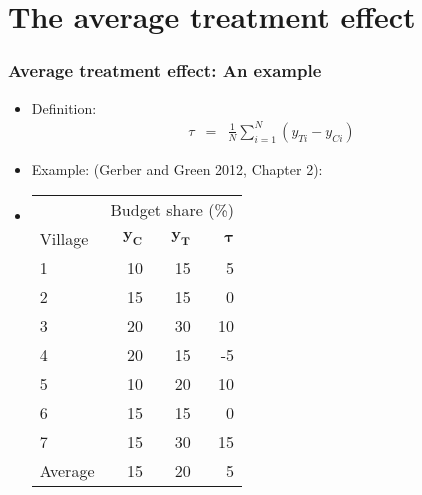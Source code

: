 \documentclass[table, xcolor = {dvipsnames}, 9pt]{beamer}
\theoremstyle{plain}
\newcommand{\bh}[1]{{\color{blue}{#1}}}
\begin{document}
\section{The average treatment effect}
\begin{frame}
\frametitle{Average treatment effect: An example} 
\begin{itemize}
\item Definition: \bh{Average Treatment Effect (ATE)}
\begin{eqnarray*}
\tau & = &  \frac{1}{N}\sum_{i = 1}^N \left(y_{Ti} - y_{Ci} \right)
\end{eqnarray*} \pause
\item Example: \bh{``Village heads'' study} (Gerber and Green 2012, Chapter 2): \vspace{0.1in}
\item[]
\begin{center}
\begin{tabular}{l|rrr} \hline
& \multicolumn{3}{c}{Budget share (\%)} \\
Village &$\bm{y_C}$& $\bm{y_T}$& $\bm{\tau}$  \\ \hline
1& 10 & 15  & 5  \\
2& 15 & 15  & 0   \\ 
3& 20 & 30  & 10   \\
4& 20 & 15  & -5   \\
5& 10 & 20  & 10   \\
6& 15 & 15  & 0   \\
7& 15 & 30  & 15   \\ \hline
Average & 15 & 20 & 5  \\ \hline
\end{tabular}
\end{center}
\end{itemize}
\end{frame}
\end{document}
